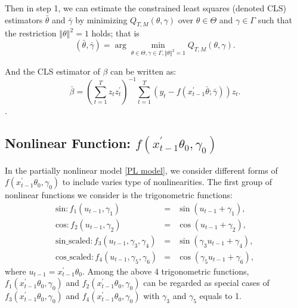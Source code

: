 \documentclass[a4paper,12pt,times,numbered,print,index]{report}
\numberwithin{equation}{section}
\begin{document}
Then in step 1, we can estimate the constrained least squares (denoted CLS) estimators $\bar{\theta}$ and $%
\bar{\gamma}$ by minimizing $Q_{T,M}\left( \theta ,\gamma \right) 
$ over $\theta \in \Theta $ and $\gamma \in \Gamma $ such that the
restriction $\left\Vert \theta \right\Vert ^{2}=1$ holds; that is%
\begin{equation*}
\left( \bar{\theta},\bar{\gamma}\right) =\arg \min_{\theta \in \Theta
	,\gamma \in \Gamma ,\left\Vert \theta \right\Vert ^{2}=1}Q_{T,M}\left(
\theta ,\gamma \right) .  \label{cls_c3}
\end{equation*}%

And the CLS estimator of $\beta$ can be written as:
$$
\bar{\beta} = \left( \sum_{t=1}^{T}z_t z_t^{\prime}\right)^{-1}\sum_{t=1}^{T}\left( y_t- f\left( x_{t-1}^{\prime }\bar{\theta}; \bar{\gamma}\right)\right) z_t.
$$.

\subsection{Nonlinear Function: $f\left(x_{t-1}^{\prime }\theta _{0},\gamma _{0}\right)$}
In the partially nonlinear model \ref{PL model}, we consider different forms of $f\left(x_{t-1}^{\prime }\theta _{0},\gamma _{0}\right)$ to include varies type of nonlinearities. The first group of nonlinear functions we consider is the trigonometric functions: 
\begin{eqnarray*}
	\text{sin}: f_{1}\left( u_{t-1},\gamma _{1}\right) &=&\sin \left( u_{t-1}+\gamma_{1}\right),  \\
	\text{cos}: f_{2}\left( u_{t-1},\gamma _{2}\right) &=&\cos \left( u_{t-1}+\gamma_{2}\right), \\
	\text{sin\_scaled}: f_{3}\left( u_{t-1},\gamma_{3}, \gamma_{4}\right) &=&\sin \left( \gamma_{3}u_{t-1}+\gamma_{4}\right),  \\
	\text{cos\_scaled}: f_{4}\left( u_{t-1},\gamma_{5}, \gamma_{6}\right) &=&\cos \left( \gamma_{5}u_{t-1}+\gamma_{6}\right),
\end{eqnarray*} 
where $u_{t-1} =  x_{t-1}^{\prime }\theta _{0}$.
Among the above 4 trigonometric functions, $f_{1} \left(x_{t-1}^{\prime }\theta _{0},\gamma _{0}\right)$ and $f_{2} \left(x_{t-1}^{\prime }\theta _{0},\gamma _{0}\right)$ can be regarded as special cases of $f_{3}\left(x_{t-1}^{\prime }\theta _{0},\gamma _{0}\right)$ and $f_{4} \left(x_{t-1}^{\prime }\theta _{0},\gamma _{0}\right)$ with $\gamma_{3}$ and $\gamma_{5}$ equals to 1. 
\end{document}
